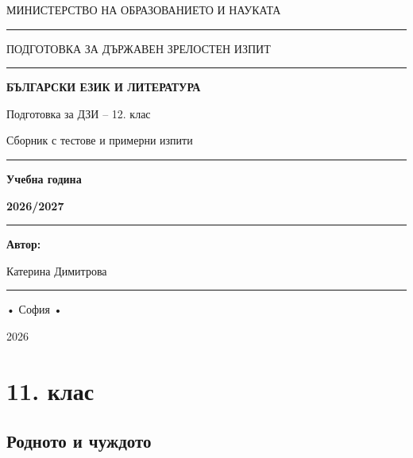 \documentclass[12pt,a4paper]{article}
\begin{document}
\begin{titlepage}
\centering

\vspace*{2cm}
{\large МИНИСТЕРСТВО НА ОБРАЗОВАНИЕТО И НАУКАТА\par}
\vspace{-0.2cm}
\noindent\rule{0.8\textwidth}{0.5pt}
\vspace{0.3cm}
{\large ПОДГОТОВКА ЗА ДЪРЖАВЕН ЗРЕЛОСТЕН ИЗПИТ\par}
\vspace{-0.4cm}
\noindent\rule{0.8\textwidth}{0.5pt}
\vspace{0.8cm}

\vspace{1.5cm}
{\Huge\bfseries БЪЛГАРСКИ ЕЗИК И ЛИТЕРАТУРА\par}
\vspace{0.6cm}
{\Large Подготовка за ДЗИ – 12. клас\par}
\vspace{0.6cm}
{\Large Сборник с тестове и примерни изпити\par}
\vspace{2.4cm}

\noindent\rule{1.0\textwidth}{0.5pt}
\vspace{0.4cm}
{\Large\bfseries Учебна година\par}
{\Large\bfseries 2026/2027 \par}
\vspace{-0.2cm}

\noindent\rule{1.0\textwidth}{0.5pt}
{\Large\bfseries Автор:\par}
{\large Катерина Димитрова\par}
\noindent\rule{1.0\textwidth}{0.5pt}
\vfill
{\large • София • \par}
{\large 2026 \par}
\end{titlepage}

\tableofcontents
\newpage

\section{11. клас}

\subsection{Родното и чуждото}
\end{document}
